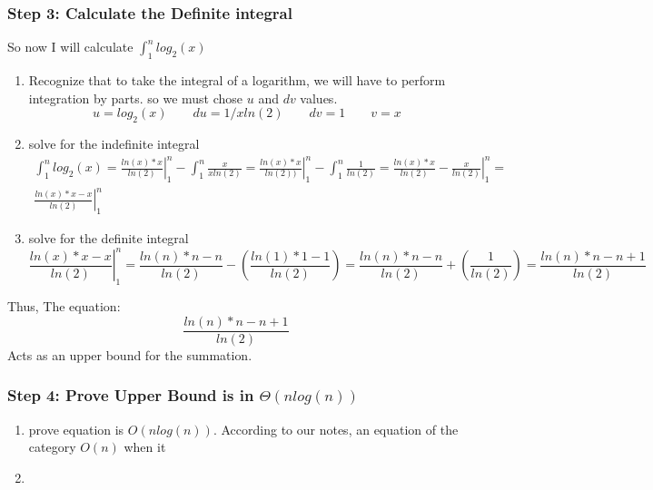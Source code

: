 \documentclass[10pt,a4paper]{article}
\newcommand*\Eval[3]{\left.#1\right\rvert_{#2}^{#3}}
\begin{document}
\subsubsection{Step 3: Calculate the Definite integral}
So now I will calculate $\int_1^n log_2(x)$
\begin{enumerate}
  \item Recognize that to take the integral of a logarithm, we will have to perform integration by parts. so we must chose $u$ and $dv$ values.
  \begin{equation}
    u = log_2(x)\qquad du = 1/xln(2) \qquad dv = 1 \qquad v = x
  \end{equation}
  \item solve for the indefinite integral
  \begin{multline}
    \int_1^n log_2(x) = \Eval{\frac{ln(x)*x}{ln(2)}}{1}{n}- \int_1^n \frac{x}{xln(2)} = \Eval{\frac{ln(x)*x}{ln(2))}}{1}{n} - \int_1^n \frac{1}{ln(2)} = \Eval{\frac{ln(x)*x}{ln(2)} - \frac{x}{ln(2)}}{1}{n} = \\ \Eval{\frac{ln(x)*x-x}{ln(2)}}{1}{n}
  \end{multline}
  \item solve for the definite integral
  \begin{equation*}
    \Eval{\frac{ln(x)*x-x}{ln(2)}}{1}{n} = \frac{ln(n)*n-n}{ln(2)} - \left(\frac{ln(1)*1-1}{ln(2)}\right) = \frac{ln(n)*n-n}{ln(2)} + \left(\frac{1}{ln(2)}\right) = \frac{ln(n)*n-n + 1}{ln(2)}
  \end{equation*}
\end{enumerate}
Thus, The equation:
\begin{equation*}
  \frac{ln(n)*n-n + 1}{ln(2)}
\end{equation*}
Acts as an upper bound for the summation.
\subsubsection{Step 4: Prove Upper Bound is in $\Theta(n log(n))$}
\begin{enumerate}
  \item prove equation is $O(n log(n))$.
  According to our notes, an equation of the category $O(n)$ when it
  \begin{equation}
  \end{equation}
  \item
\end{enumerate}

\end{document}
